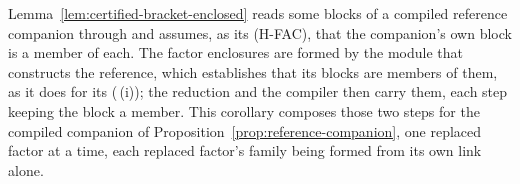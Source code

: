 
Lemma~\ref{lem:certified-bracket-enclosed} reads some blocks of a compiled
reference companion through  and assumes, as its (H-FAC),
that the companion's own block is a member of each. The factor enclosures
are formed by the module that constructs the reference, which establishes
that its blocks are members of them, as it does for its
(\,(i)); the reduction and the compiler
then carry them, each step keeping the block a member. This corollary
composes those two steps for the compiled companion of
Proposition~\ref{prop:reference-companion}, one replaced factor at a time,
each replaced factor's family being formed from its own link alone.

